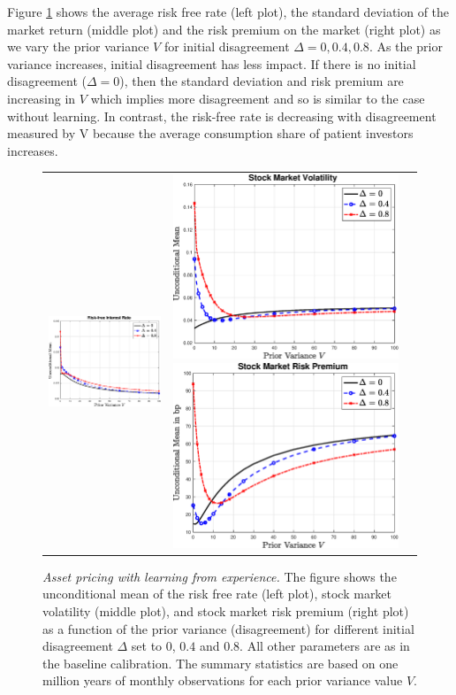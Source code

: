 Figure \ref{APlearningFIG} shows the average risk free rate (left plot), the standard deviation of the market return (middle plot) and the risk premium on the market (right plot) as we vary the prior variance $V$ for initial disagreement $\Delta=0, 0.4, 0.8$. As the prior variance increases, initial disagreement has less impact. If there is no initial disagreement ($\Delta=0$), then the standard deviation and risk premium are increasing in $V$ which implies more disagreement and so is similar to the case without learning. In contrast, the risk-free rate is decreasing with disagreement measured by V because the average consumption share of patient investors increases. 

\begin{figure}[htbp] 
\centering
\vspace{0.1in}
\begin{tabular}{ccc}
\includegraphics[width=.3\textwidth]{figures/Fig_learning_r_v1.eps} &
\includegraphics[width=.3\textwidth]{figures/Fig_learning_StdevRM_v1.eps}
\includegraphics[width=.3\textwidth]{figures/Fig_learning_RiskP_v1.eps}
\end{tabular}
\caption{\emph{Asset pricing with learning from experience.} \footnotesize{The figure shows the unconditional mean of the risk free rate (left plot), stock market volatility (middle plot), and stock market risk premium (right plot) as a function of the prior variance (disagreement) for different initial disagreement $\Delta$ set to $0$, $0.4$ and $0.8$.  All other parameters are as in the baseline calibration. The summary statistics are based on one million years of monthly observations for each prior variance value $V$.}} \label{APlearningFIG} %
\end{figure}

